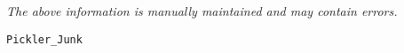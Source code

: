 \label{pkg:pickler\_junk}

{\tiny \it The above information is manually maintained and may contain errors.}
\begin{verbatim}
Pickler_Junk
\end{verbatim}
